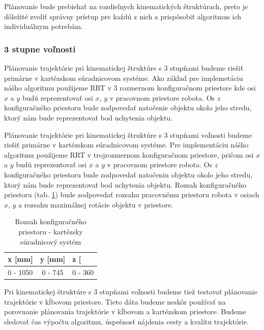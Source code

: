 Plánovanie bude prebiehať na rozdielnych kinematických štruktúrach, preto je dôležité zvoliť správny prístup pre každú z nich a prispôsobiť algoritmus ich individuálnym potrebám.

 
\subsubsection{3 stupne voľnosti}
Plánovanie trajektórie pri kinematickej štruktúre s 3 stupňami budeme riešiť primárne v kartézskom súradnicovom systéme. 
Ako základ pre implemetáciu nášho algoritmu použijeme RRT v 3 rozmernom konfiguračnom priestore kde osi $x$ a $y$ budú reprezentovať osi $x$, $y$ v pracovnom priestore robota. Os $z$ konfiguračného priestoru bude zodpovedať natočenie objektu okolo jeho stredu, ktorý nám bude reprezentovať bod uchytenia objektu.

Plánovanie trajektórie pri kinematickej štruktúre s 3 stupňami voľnosti budeme riešiť primárne v kartézskom súradnicovom systéme. Pre implementáciu nášho algoritmu použijeme RRT v trojrozmernom konfiguračnom priestore, pričom osi $x$ a $y$ budú reprezentovať osi $x$ a $y$ v pracovnom priestore robota. Os $z$ konfiguračného priestoru bude zodpovedať natočeniu objektu okolo jeho stredu, ktorý nám bude reprezentovať bod uchytenia objektu. Rozsah konfiguračného priestoru (tab. \ref{table 3.1}) bude zodpovedať rozsahu pracovnému priestoru robota v osiach $x$, $y$ a rozsahu maximálnej rotácie objektu v priestore.

\begin{table}[h!]
	\centering
	\begin{tabular}{|c|c|c|}
		\hline
		\multicolumn{1}{|l|}{x {[}mm{]}}  & \multicolumn{1}{l|}{y {[}mm{]}} & \multicolumn{1}{l|}{z {[}\degree{]}} \\ \hline
		0 - 1050                                              & 0 - 745                                             & 0 - 360                              \\ \hline

	\end{tabular}
	\caption{Rozsah konfiguračného priestoru - kartézsky súradnicový systém}\label{table 3.1} 
\end{table}

Pri kinematickej štruktúre s 3 stupňami voľnosti budeme tiež testovať plánovanie trajektórie v kĺbovom priestore. Tieto dáta budeme neskôr používať na porovnanie plánovania trajektórie v kĺbovom a kartézskom priestore. Budeme sledovať čas výpočtu algoritmu, úspešnosť nájdenia cesty a kvalitu trajektórie.

